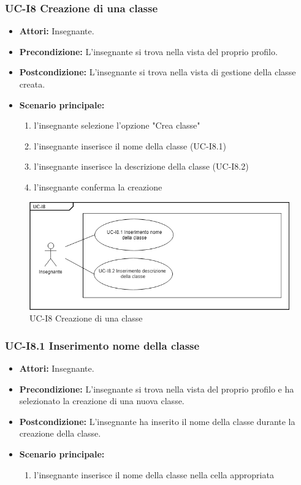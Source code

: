 \subsubsection{UC-I8 Creazione di una classe}
\begin{itemize}
	\item \textbf{Attori:} Insegnante.
	\item \textbf{Precondizione:} L'insegnante si trova nella vista del proprio profilo.
	\item \textbf{Postcondizione:} L'insegnante si trova nella vista di gestione della classe creata.
	\item \textbf{Scenario principale:}
	\begin{enumerate}
		\item l'insegnante selezione l'opzione "Crea classe"
		\item l'insegnante inserisce il nome della classe (UC-I8.1)
		\item l'insegnante inserisce la descrizione della classe (UC-I8.2)
		\item l'insegnante conferma la creazione
	\end{enumerate}
\end{itemize}

\begin{figure}[h]
		\centering
		\includegraphics[scale=0.7]{images/UC-I8.png}
		\caption{UC-I8 Creazione di una classe}
	\end{figure}

\subsubsection{UC-I8.1 Inserimento nome della classe}
\begin{itemize}
	\item \textbf{Attori:} Insegnante.
	\item \textbf{Precondizione:} L'insegnante si trova nella vista del proprio profilo e ha selezionato la creazione di una nuova classe.
	\item \textbf{Postcondizione:} L'insegnante ha inserito il nome della classe durante la creazione della classe.
	\item \textbf{Scenario principale:}
	\begin{enumerate}
		\item l'insegnante inserisce il nome della classe nella cella appropriata
	\end{enumerate}
\end{itemize}

